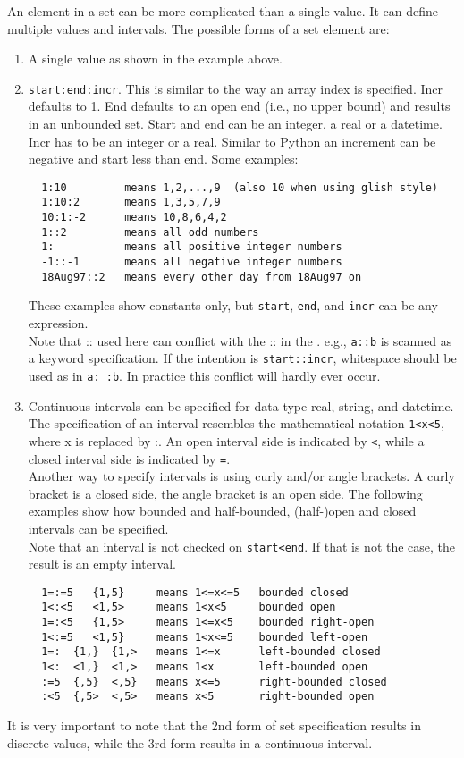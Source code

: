 An element in a set can be more complicated than a single value.
It can define multiple values and intervals. The possible forms of
a set element are:
\begin{enumerate}
\item A single value as shown in the example above.
\item \texttt{start:end:incr}. This is similar to the
way an array index is specified. Incr defaults to 1.
End defaults to an open end (i.e., no upper bound) and results
in an unbounded set. Start and end can be an integer, a real or a datetime.
Incr has to be an integer or a real. 
Similar to Python an increment can be negative and start less than end.
Some examples:
\begin{verbatim}
  1:10         means 1,2,...,9  (also 10 when using glish style)
  1:10:2       means 1,3,5,7,9
  10:1:-2      means 10,8,6,4,2
  1::2         means all odd numbers
  1:           means all positive integer numbers
  -1::-1       means all negative integer numbers
  18Aug97::2   means every other day from 18Aug97 on
\end{verbatim}
These examples show constants only, but \texttt{start}, \texttt{end},
and \texttt{incr} can be any expression.
\\Note that :: used here can conflict with the :: in the
. e.g., \texttt{a::b} is scanned as
a keyword specification. If the intention is \texttt{start::incr},
whitespace should be used as in \texttt{a: :b}. In practice this conflict
will hardly ever occur.
\item Continuous intervals can be specified for data type real, string, and datetime.
The specification of an interval resembles the mathematical notation
\texttt{1<x<5}, where x is replaced by :. An open interval side
is indicated by \texttt{<}, while a closed interval side is indicated
by \texttt{=}.
\\Another way to specify intervals is using curly and/or angle brackets.
A curly bracket is a closed side, the angle bracket is an open side.
The following examples show how bounded and half-bounded,
(half-)open and closed intervals can be specified.
\\Note that an interval is not checked on \texttt{start<end}. If that is
not the case, the result is an empty interval.
\begin{verbatim}
  1=:=5   {1,5}     means 1<=x<=5   bounded closed
  1<:<5   <1,5>     means 1<x<5     bounded open
  1=:<5   {1,5>     means 1<=x<5    bounded right-open
  1<:=5   <1,5}     means 1<x<=5    bounded left-open
  1=:  {1,}  {1,>   means 1<=x      left-bounded closed
  1<:  <1,}  <1,>   means 1<x       left-bounded open
  :=5  {,5}  <,5}   means x<=5      right-bounded closed
  :<5  {,5>  <,5>   means x<5       right-bounded open
\end{verbatim}
\end{enumerate}
It is very important to note that the 2nd form of set specification results in
discrete values, while the 3rd form results in a continuous interval.


